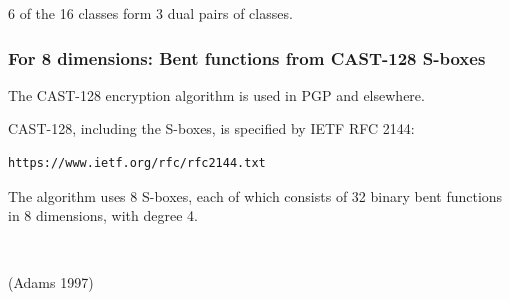 \documentclass[pdf,sprung,slideColor,nocolorBG]{beamer}
\newenvironment{colortheme}[1]{
\def\ProvidesPackageRCS $##1${\relax}
\renewcommand{\ProcessOptions}{\relax}
\makeatletter

\makeatother
}{}
\newcommand{\slidecite}[1]{\tiny{(#1)}\normalsize{}}
\begin{document}
\begin{colortheme}{jubata}
\begin{frame}
\begin{figure}
\begin{minipage}{.48\textwidth}
  \label{fig:psf_9_5439_dual_cayley_graph_index_matrix}
\end{minipage}%
\end{figure}
6 of the 16 classes form 3 dual pairs of classes.
\end{frame}

\end{colortheme}

\begin{colortheme}{seagull}

\begin{frame}[fragile]
\frametitle{For 8 dimensions: Bent functions from CAST-128 S-boxes}

The CAST-128 encryption algorithm is used in PGP and elsewhere.

CAST-128, including the S-boxes, is specified by IETF RFC 2144:
\begin{verbatim}
https://www.ietf.org/rfc/rfc2144.txt
\end{verbatim}

The algorithm uses 8 S-boxes, each of which consists of 32 binary bent functions in 8 dimensions,
with degree 4.

~

\slidecite{Adams 1997}
\end{frame}

\end{colortheme}
\end{document}
